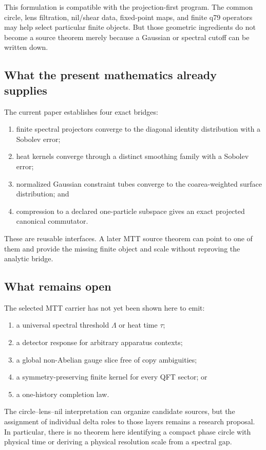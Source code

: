 \documentclass[11pt]{article}
\begin{document}
This formulation is compatible with the projection-first program. The common
circle, lens filtration, nil/shear data, fixed-point maps, and finite q79
operators may help select particular finite objects. But those geometric
ingredients do not become a source theorem merely because a Gaussian or
spectral cutoff can be written down.

\subsection{What the present mathematics already supplies}

The current paper establishes four exact bridges:
\begin{enumerate}
\item finite spectral projectors converge to the diagonal identity
distribution with a Sobolev error;
\item heat kernels converge through a distinct smoothing family with a
Sobolev error;
\item normalized Gaussian constraint tubes converge to the coarea-weighted
surface distribution; and
\item compression to a declared one-particle subspace gives an exact
projected canonical commutator.
\end{enumerate}

These are reusable interfaces. A later MTT source theorem can point to one of
them and provide the missing finite object and scale without reproving the
analytic bridge.

\subsection{What remains open}

The selected MTT carrier has not yet been shown here to emit:
\begin{enumerate}
\item a universal spectral threshold \(\Lambda\) or heat time \(\tau\);
\item a detector response for arbitrary apparatus contexts;
\item a global non-Abelian gauge slice free of copy ambiguities;
\item a symmetry-preserving finite kernel for every QFT sector; or
\item a one-history completion law.
\end{enumerate}

The circle--lens--nil interpretation can organize candidate sources, but the
assignment of individual delta roles to those layers remains a research
proposal. In particular, there is no theorem here identifying a compact phase
circle with physical time or deriving a physical resolution scale from a
spectral gap.
\end{document}
